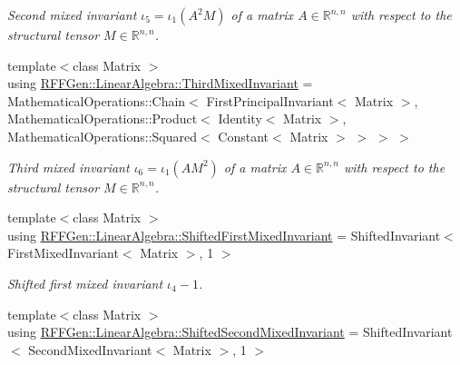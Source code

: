 \begin{DoxyCompactItemize}
\begin{DoxyCompactList}\small\item\em Second mixed invariant $ \iota_5=\iota_1(A^2M) $ of a matrix $A\in\mathbb{R}^{n,n}$ with respect to the structural tensor $M\in\mathbb{R}^{n,n}$. \end{DoxyCompactList}\item 
\hypertarget{group__InvariantGroup_gab211541411dec582511acf5b0e956864}{{\footnotesize template$<$class Matrix $>$ }\\using \hyperlink{group__InvariantGroup_gab211541411dec582511acf5b0e956864}{R\-F\-F\-Gen\-::\-Linear\-Algebra\-::\-Third\-Mixed\-Invariant} = Mathematical\-Operations\-::\-Chain$<$ First\-Principal\-Invariant$<$ Matrix $>$, Mathematical\-Operations\-::\-Product$<$ Identity$<$ Matrix $>$, Mathematical\-Operations\-::\-Squared$<$ Constant$<$ Matrix $>$ $>$ $>$ $>$}\label{group__InvariantGroup_gab211541411dec582511acf5b0e956864}

\begin{DoxyCompactList}\small\item\em Third mixed invariant $ \iota_6=\iota_1(AM^2) $ of a matrix $A\in\mathbb{R}^{n,n}$ with respect to the structural tensor $M\in\mathbb{R}^{n,n}$. \end{DoxyCompactList}\item 
\hypertarget{group__InvariantGroup_ga864cde216d56b082449e33422f7fcc76}{{\footnotesize template$<$class Matrix $>$ }\\using \hyperlink{group__InvariantGroup_ga864cde216d56b082449e33422f7fcc76}{R\-F\-F\-Gen\-::\-Linear\-Algebra\-::\-Shifted\-First\-Mixed\-Invariant} = Shifted\-Invariant$<$ First\-Mixed\-Invariant$<$ Matrix $>$, 1 $>$}\label{group__InvariantGroup_ga864cde216d56b082449e33422f7fcc76}

\begin{DoxyCompactList}\small\item\em Shifted first mixed invariant $ \iota_4 - 1 $. \end{DoxyCompactList}\item 
\hypertarget{group__InvariantGroup_ga023b3c54182be971c7d3ba9dda15fa3d}{{\footnotesize template$<$class Matrix $>$ }\\using \hyperlink{group__InvariantGroup_ga023b3c54182be971c7d3ba9dda15fa3d}{R\-F\-F\-Gen\-::\-Linear\-Algebra\-::\-Shifted\-Second\-Mixed\-Invariant} = Shifted\-Invariant$<$ Second\-Mixed\-Invariant$<$ Matrix $>$, 1 $>$}\label{group__InvariantGroup_ga023b3c54182be971c7d3ba9dda15fa3d}


\end{DoxyCompactItemize}

